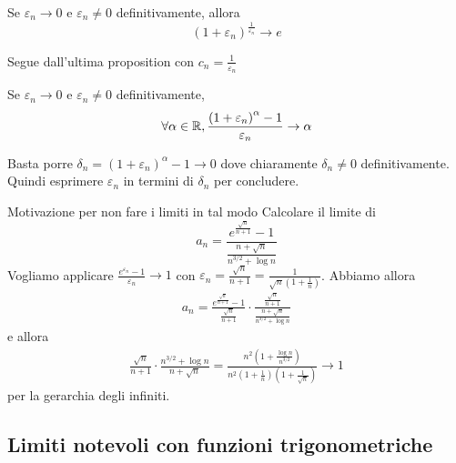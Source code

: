 \documentclass[a4paper]{article}
\begin{document}
\begin{snippetproposition}{}
    Se \(\varepsilon_n \to 0\) e \(\varepsilon_n \neq 0\) definitivamente, allora
    \[
        {\left(1 + \varepsilon_n\right)}^{\frac{1}{\varepsilon_n}} \to e
    \]
\end{snippetproposition}

Segue dall'ultima proposition con \(c_n = \frac{1}{\varepsilon_n}\)

\begin{snippetproposition}{}
    Se \(\varepsilon_n \to 0\) e \(\varepsilon_n \neq 0\) definitivamente,
    \[
        \forall \alpha \in \mathbb{R}, \frac{{(1 + \varepsilon_n)}^\alpha - 1}{\varepsilon_n} \to \alpha
    \]
\end{snippetproposition}

\begin{snippetproof}{}
    Basta porre \(\delta_n = {(1 + \varepsilon_n)}^\alpha - 1 \to 0\)
    dove chiaramente \(\delta_n \neq 0\) definitivamente.
    Quindi esprimere \(\varepsilon_n\) in termini di \(\delta_n\) per concludere.
\end{snippetproof}

\begin{snippetexample}{Motivazione per non fare i limiti in tal modo}
    Calcolare il limite di
    \[
        a_n = \frac{e^{\frac{\sqrt{n}}{n+1}} - 1}{\frac{n + \sqrt{n}}{n^{3/2} + \log n}}
    \]
    Vogliamo applicare \(\frac{e^{\varepsilon_n} - 1}{\varepsilon_n} \to 1\)
    con \(\varepsilon_n = \frac{\sqrt{n}}{n + 1} = \frac{1}{\sqrt{n}(1+\frac{1}{n})}\).
    Abbiamo allora
    \begin{align*}
        a_n = \frac{
            e^{\frac{\sqrt{n}}{n+1}} - 1
        }{
            \frac{\sqrt{n}}{n+1}
        }
        \cdot
        \frac{
            \frac{\sqrt{n}}{n+1}
        }{
            \frac{n + \sqrt{n}}{n^{3/2} + \log n}
        }
    \end{align*}
    e allora
    \begin{align*}
        \frac{\sqrt{n}}{n+1} \cdot \frac{
            n^{3/2} + \log n
        }{
            n + \sqrt{n}
        }
        =
        \frac{
            n^2 \left(1 + \frac{\log n}{n^{3/2}}\right)
        }{
            n^2 \left(1 + \frac{1}{n}\right) \left(1 + \frac{1}{\sqrt{n}}\right)
        }
        \to 1
    \end{align*}
    per la gerarchia degli infiniti.
\end{snippetexample}

\subsection{Limiti notevoli con funzioni trigonometriche}
\end{document}
